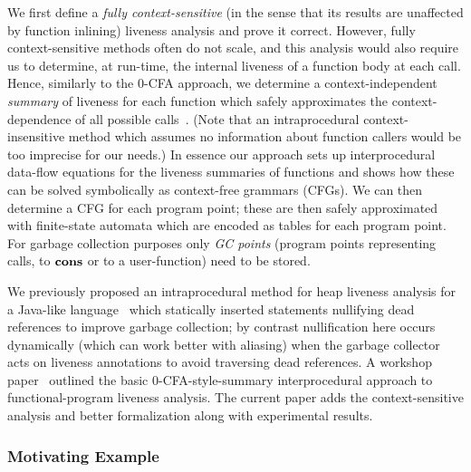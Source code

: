 We first define a {\em fully context-sensitive} (in the sense that its
results  are unaffected  by function  inlining) liveness  analysis and
prove it  correct.  However, fully context-sensitive  methods often do
not scale,  and this analysis would  also require us  to determine, at
run-time,  the internal  liveness of  a  function body  at each  call.
Hence,   similarly   to   the   0-CFA   approach,   we   determine   a
context-independent {\em summary} of  liveness for each function which
safely   approximates   the   context-dependence   of   all   possible
calls~\cite{chatterjee99relevant,cherem07fast,lee05static}.       (Note
that  an intraprocedural context-insensitive  method which  assumes no
information  about function  callers would  be too  imprecise  for our
needs.)   In essence  our approach  sets up  interprocedural data-flow
equations for the liveness summaries  of functions and shows how these
can be solved symbolically  as context-free grammars (CFGs)\@.  We can
then determine  a CFG  for each program  point; these are  then safely
approximated with  finite-state automata  which are encoded  as tables
for each program point.  For  garbage collection purposes only {\em GC
  points}  (program points  representing  calls, to  $\mbox{$\mathbf{cons}$}$  or to  a
user-function) need to be stored.

We  previously proposed  an intraprocedural  method for  heap liveness
analysis   for   a   Java-like   language~\cite{khedker07heap}   which
statically inserted  statements nullifying dead  references to improve
garbage collection; by  contrast nullification here occurs dynamically
(which can work better with  aliasing) when the garbage collector acts
on  liveness  annotations  to  avoid traversing  dead  references.   A
workshop    paper~\cite{karkare07liveness}    outlined    the    basic
0-CFA-style-summary  interprocedural  approach  to  functional-program
liveness  analysis.   The  current  paper adds  the  context-sensitive
analysis and better formalization along with experimental results.

\kern -3pt   %


\setcounter{page}{2}
\subsubsection{Motivating Example}
\label{sec:motiv}

